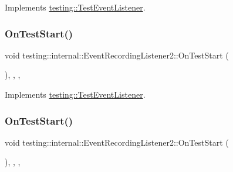 Implements \mbox{\hyperlink{classtesting_1_1_test_event_listener_a5f6c84f39851e8a603a2d2e10063816b}{testing\+::\+Test\+Event\+Listener}}.

\mbox{\label{classtesting_1_1internal_1_1_event_recording_listener2_ac3231fff64b23bbd05e3a2cc57e20df9}} 
\subsubsection{\texorpdfstring{OnTestStart()}{OnTestStart()}\hspace{0.1cm}{\footnotesize\ttfamily [1/2]}}
{\footnotesize\ttfamily void testing\+::internal\+::\+Event\+Recording\+Listener2\+::\+On\+Test\+Start (\begin{DoxyParamCaption}\item[{const \mbox{\hyperlink{classtesting_1_1_test_info}{Test\+Info}} \&}]{ }\end{DoxyParamCaption})\hspace{0.3cm}{\ttfamily [inline]}, {\ttfamily [override]}, {\ttfamily [protected]}, {\ttfamily [virtual]}}



Implements \mbox{\hyperlink{classtesting_1_1_test_event_listener_ab4f6a0ca16ae75daf385b3b5914e1048}{testing\+::\+Test\+Event\+Listener}}.

\mbox{\label{classtesting_1_1internal_1_1_event_recording_listener2_ac3231fff64b23bbd05e3a2cc57e20df9}} 
\subsubsection{\texorpdfstring{OnTestStart()}{OnTestStart()}\hspace{0.1cm}{\footnotesize\ttfamily [2/2]}}
{\footnotesize\ttfamily void testing\+::internal\+::\+Event\+Recording\+Listener2\+::\+On\+Test\+Start (\begin{DoxyParamCaption}\item[{const \mbox{\hyperlink{classtesting_1_1_test_info}{Test\+Info}} \&}]{ }\end{DoxyParamCaption})\hspace{0.3cm}{\ttfamily [inline]}, {\ttfamily [override]}, {\ttfamily [protected]}, {\ttfamily [virtual]}}



